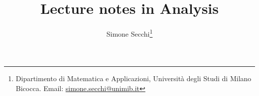 \documentclass[a4paper,abstract=true,DIV=default,toc=index]{scrbook}
\numberwithin{equation}{section}
\theoremstyle{definition}
\theoremstyle{remark}
\numberwithin{equation}{section}
\begin{document}
\title{Lecture notes in Analysis}

\author{Simone Secchi\thanks{Dipartimento di Matematica e
    Applicazioni, Universit\`a degli Studi di Milano Bicocca. Email:
    \href{mailto:simone.secchi@unimib.it}{simone.secchi@unimib.it}}}


\date{\DTMnow}


\maketitle



\end{document}
